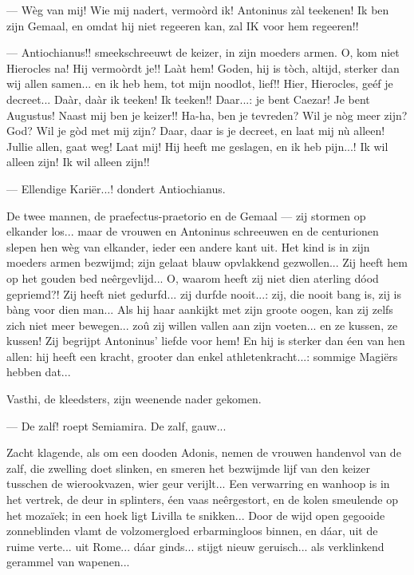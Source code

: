 \documentclass[a4paper, 12pt, oneside, dutch]{article}
\begin{document}
--- Wèg van mij! Wie mij nadert, vermoòrd ik! Antoninus zàl teekenen! Ik ben zijn Gemaal, en omdat hij niet regeeren kan, zal IK voor hem regeeren!!

--- Antiochianus!! smeekschreeuwt de keizer, in zijn moeders armen. O, kom niet Hierocles na! Hij vermoòrdt je!! Laàt hem! Goden, hij is tòch, altijd, sterker dan wij allen samen... en ik heb hem, tot mijn noodlot, lief!! Hier, Hierocles, geéf je decreet... Daàr, daàr ik teeken! Ik teeken!! Daar...: je bent Caezar! Je bent Augustus! Naast mij ben je keizer!! Ha-ha, ben je tevreden? Wil je nòg meer zijn? God? Wil je gòd met mij zijn? Daar, daar is je decreet, en laat mij nù alleen! Jullie allen, gaat weg! Laat mij! Hij heeft me geslagen, en ik heb pijn...! Ik wil alleen zijn! Ik wil alleen zijn!!

--- Ellendige Kariër...! dondert Antiochianus.

De twee mannen, de praefectus-praetorio en de Gemaal --- zij stormen op elkander los... maar de vrouwen en Antoninus schreeuwen en de centurionen slepen hen wèg van elkander, ieder een andere kant uit. Het kind is in zijn moeders armen bezwijmd; zijn gelaat blauw opvlakkend gezwollen... Zij heeft hem op het gouden bed neêrgevlijd... O, waarom heeft zij niet dien aterling dóod gepriemd?! Zij heeft niet gedurfd... zij durfde nooit...: zij, die nooit bang is, zij is bàng voor dien man... Als hij haar aankijkt met zijn groote oogen, kan zij zelfs zich niet meer bewegen... zoû zij willen vallen aan zijn voeten... en ze kussen, ze kussen! Zij begrijpt Antoninus' liefde voor hem! En hij is sterker dan éen van hen allen: hij heeft een kracht, grooter dan enkel athletenkracht...: sommige Magiërs hebben dat...

Vasthi, de kleedsters, zijn weenende nader gekomen.

--- De zalf! roept Semiamira. De zalf, gauw...

Zacht klagende, als om een dooden Adonis, nemen de vrouwen handenvol van de zalf, die zwelling doet slinken, en smeren het bezwijmde lijf van den keizer tusschen de wierookvazen, wier geur verijlt... Een verwarring en wanhoop is in het vertrek, de deur in splinters, éen vaas neêrgestort, en de kolen smeulende op het mozaïek; in een hoek ligt Livilla te snikken... Door de wijd open gegooide zonneblinden vlamt de volzomergloed erbarmingloos binnen, en dáar, uit de ruime verte... uit Rome... dáar ginds... stijgt nieuw geruisch... als verklinkend gerammel van wapenen...
\end{document}
